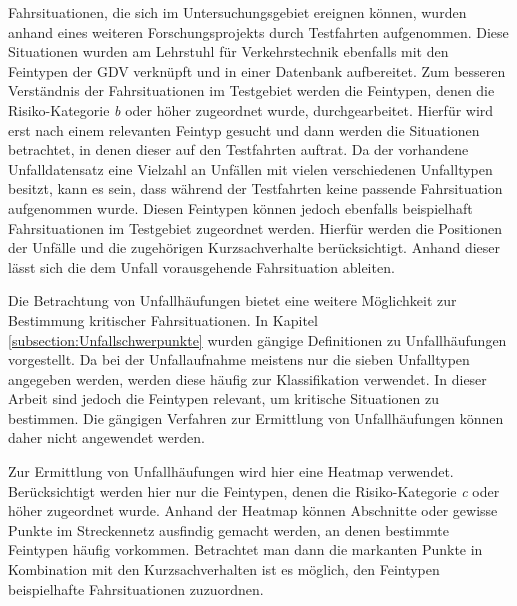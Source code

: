 Fahrsituationen, die sich im Untersuchungsgebiet ereignen können, wurden anhand eines weiteren Forschungsprojekts durch Testfahrten aufgenommen. Diese Situationen wurden am Lehrstuhl für Verkehrstechnik ebenfalls mit den Feintypen der GDV verknüpft und in einer Datenbank aufbereitet. Zum besseren Verständnis der Fahrsituationen im Testgebiet werden die Feintypen, denen die Risiko-Kategorie \textit{b} oder höher zugeordnet wurde, durchgearbeitet. Hierfür wird erst nach einem relevanten Feintyp gesucht und dann werden die Situationen betrachtet, in denen dieser auf den Testfahrten auftrat. Da der vorhandene Unfalldatensatz eine Vielzahl an Unfällen mit vielen verschiedenen Unfalltypen besitzt, kann es sein, dass während der Testfahrten keine passende Fahrsituation aufgenommen wurde. Diesen Feintypen können jedoch ebenfalls beispielhaft Fahrsituationen im Testgebiet zugeordnet werden. Hierfür werden die Positionen der Unfälle und die zugehörigen Kurzsachverhalte berücksichtigt. Anhand dieser lässt sich die dem Unfall vorausgehende Fahrsituation ableiten.

Die Betrachtung von Unfallhäufungen bietet eine weitere Möglichkeit zur Bestimmung kritischer Fahrsituationen. In Kapitel \ref{subsection:Unfallschwerpunkte} wurden gängige Definitionen zu Unfallhäufungen vorgestellt. Da bei der Unfallaufnahme meistens nur die sieben Unfalltypen angegeben werden, werden diese häufig  zur Klassifikation verwendet. In dieser Arbeit sind jedoch die Feintypen relevant, um kritische Situationen zu bestimmen. Die gängigen Verfahren zur Ermittlung von Unfallhäufungen können daher nicht angewendet werden.

Zur Ermittlung von Unfallhäufungen wird hier eine Heatmap verwendet. Berücksichtigt werden hier nur die Feintypen, denen die Risiko-Kategorie \textit{c} oder höher zugeordnet wurde. Anhand der Heatmap können Abschnitte oder gewisse Punkte im Streckennetz ausfindig gemacht werden, an denen bestimmte Feintypen häufig vorkommen. Betrachtet man dann die markanten Punkte in Kombination mit den Kurzsachverhalten ist es möglich, den Feintypen beispielhafte Fahrsituationen zuzuordnen.